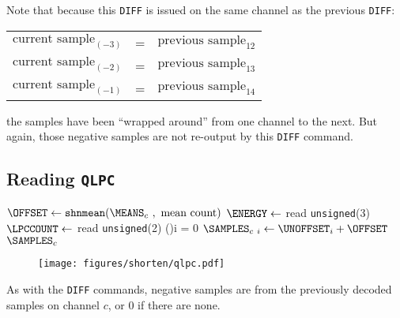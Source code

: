 \par
\noindent
Note that because this \texttt{DIFF} is issued on the same channel
as the previous \texttt{DIFF}:
\begin{table}[h]
\begin{tabular}{rcl}
  $\text{current sample}_{(-3)}$ & = & $\text{previous sample}_{12}$ \\
  $\text{current sample}_{(-2)}$ & = & $\text{previous sample}_{13}$ \\
  $\text{current sample}_{(-1)}$ & = & $\text{previous sample}_{14}$ \\
\end{tabular}
\end{table}
\par
\noindent
the samples have been ``wrapped around'' from one channel to the next.
But again, those negative samples are not re-output by
this \texttt{DIFF} command.

\clearpage

\subsection{Reading \texttt{QLPC}}
{
$\text{\OFFSET} \leftarrow \texttt{shnmean}(\text{\MEANS}_c~,~\text{mean count})$\;
$\ENERGY \leftarrow$ read \texttt{unsigned}(3)\;
$\LPCCOUNT \leftarrow$ read \texttt{unsigned}(2)\;
\For(){i = 0 \emph{\KwTo}\BLOCKLENGTH}{
  $\text{\SAMPLES}_{c~i} \leftarrow \text{\UNOFFSET}_i + \OFFSET$
}
\Return $\text{\SAMPLES}_c$\;
\EALGORITHM
}
\begin{figure}[h]
\texttt{[image: figures/shorten/qlpc.pdf]}
\end{figure}
\par
\noindent
As with the \texttt{DIFF} commands, negative samples are from the
previously decoded samples on channel $c$, or 0 if there are none.

